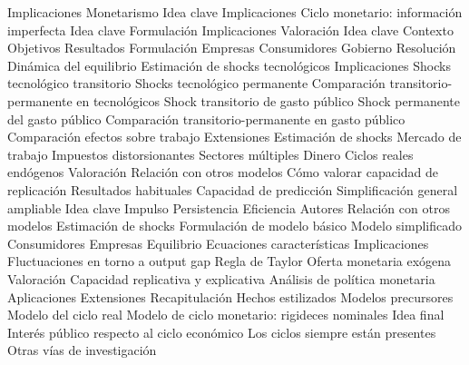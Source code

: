 \documentclass{nuevotema}
\begin{document}
\begin{esquema}[enumerate]
			\3 Implicaciones
		\2 Monetarismo
			\3 Idea clave
			\3 Implicaciones
		\2 Ciclo monetario: información imperfecta
			\3 Idea clave
			\3 Formulación
			\3 Implicaciones
			\3 Valoración
	\1 
		\2 Idea clave
			\3 Contexto
			\3 Objetivos
			\3 Resultados
		\2 Formulación
			\3 Empresas
			\3 Consumidores
			\3 Gobierno
			\3 Resolución
			\3 Dinámica del equilibrio
			\3 Estimación de shocks tecnológicos
		\2 Implicaciones
			\3 Shocks tecnológico transitorio
			\3 Shocks tecnológico permanente
			\3 Comparación transitorio-permanente en tecnológicos
			\3 Shock transitorio de gasto público
			\3 Shock permanente del gasto público
			\3 Comparación transitorio-permanente en gasto público
			\3 Comparación efectos sobre trabajo
		\2 Extensiones
			\3 Estimación de shocks
			\3 Mercado de trabajo
			\3 Impuestos distorsionantes
			\3 Sectores múltiples
			\3 Dinero
			\3 Ciclos reales endógenos
		\2 Valoración
			\3 Relación con otros modelos
			\3 Cómo valorar capacidad de replicación
			\3 Resultados habituales
			\3 Capacidad de predicción
			\3 Simplificación general ampliable
	\1 
		\2 Idea clave
			\3 Impulso
			\3 Persistencia
			\3 Eficiencia
			\3 Autores
			\3 Relación con otros modelos
			\3 Estimación de shocks
		\2 Formulación de modelo básico
			\3 Modelo simplificado
			\3 Consumidores
			\3 Empresas
			\3 Equilibrio
			\3 Ecuaciones características
		\2 Implicaciones
			\3 Fluctuaciones en torno a output gap
			\3 Regla de Taylor
			\3 Oferta monetaria exógena
		\2 Valoración
			\3 Capacidad replicativa y explicativa
			\3 Análisis de política monetaria
			\3 Aplicaciones
			\3 Extensiones
	\1[] 
		\2 Recapitulación
			\3 Hechos estilizados
			\3 Modelos precursores
			\3 Modelo del ciclo real
			\3 Modelo de ciclo monetario: rigideces nominales
		\2 Idea final
			\3 Interés público respecto al ciclo económico
			\3 Los ciclos siempre están presentes
			\3 Otras vías de investigación

\end{esquema}

\esquemalargo
\end{document}
